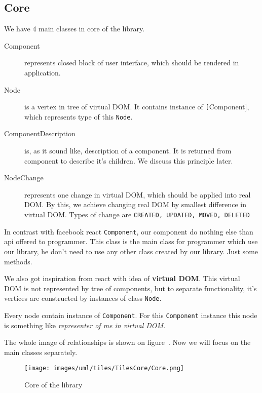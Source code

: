 \documentclass[oneside, 12pt]{book}
\begin{document}
  \subsection{Core}\label{subsec:our-architecture-core}
    We have 4 main classes in core of the library.
    \begin{description}
      \item[Component] 
        represents closed block of user interface, 
        which should be rendered in application.
      \item[Node]
        is a vertex in tree of virtual DOM. 
        It contains instance of \texttt[Component], which represents type of this \texttt{Node}.
      \item[ComponentDescription]
        is, as it sound like, description of a component. 
        It is returned from component to describe it's children. 
        We discuss this principle later.
      \item[NodeChange]
        represents one change in virtual DOM, which should be applied into real DOM. 
        By this, we achieve changing real DOM by smallest difference in virtual DOM. 
        Types of change are \texttt{CREATED, UPDATED, MOVED, DELETED}
    \end{description}

    In contrast with facebook react \texttt{Component}, our component do nothing else than api offered to programmer.
    This class is the main class for programmer which use our library, he don't need to use any other class created by our library. 
    Just some methods.

    We also got inspiration from react with idea of \textbf{virtual DOM}. 
    This virtual DOM is not represented by tree of components, but to separate functionality, 
    it's vertices are constructed by instances of class \texttt{Node}.

    Every node contain instance of \texttt{Component}. 
    For this \texttt{Component} instance this node is something like \textit{representer of me in virtual DOM}.
    
    The whole image of relationships is shown on figure~. Now we will focus on the main classes separately. 
    \begin{figure}[h]
    \centering  
      \texttt{[image: images/uml/tiles/TilesCore/Core.png]}
      \caption{Core of the library}
      \label{img:library-core}
    \end{figure}
\end{document}
